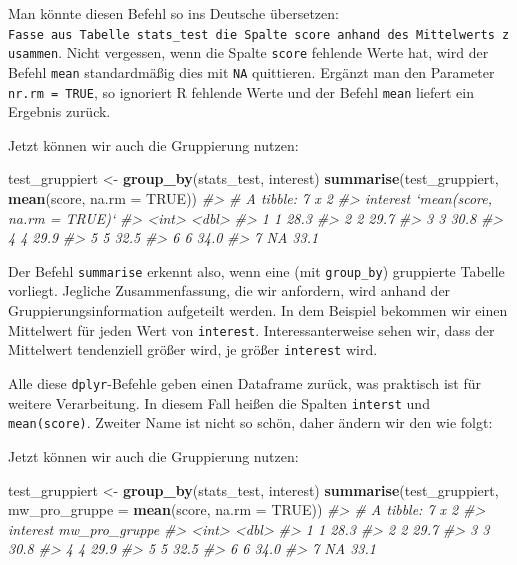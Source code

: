 \documentclass[12pt,ngerman,]{book}
\makeatletter
\newenvironment{Shaded}{\begin{snugshade}}{\end{snugshade}}
\newcommand{\KeywordTok}[1]{\textcolor[rgb]{0.13,0.29,0.53}{\textbf{{#1}}}}
\newcommand{\DataTypeTok}[1]{\textcolor[rgb]{0.13,0.29,0.53}{{#1}}}
\newcommand{\StringTok}[1]{\textcolor[rgb]{0.31,0.60,0.02}{{#1}}}
\newcommand{\CommentTok}[1]{\textcolor[rgb]{0.56,0.35,0.01}{\textit{{#1}}}}
\newcommand{\OtherTok}[1]{\textcolor[rgb]{0.56,0.35,0.01}{{#1}}}
\newcommand{\NormalTok}[1]{{#1}}
\newenvironment{kframe}{%
\medskip{}
\setlength{\fboxsep}{.8em}
 \def\at@end@of@kframe{}%
 \ifinner\ifhmode%
  \def\at@end@of@kframe{\end{minipage}}%
  \begin{minipage}{\columnwidth}%
 \fi\fi%
 \def\FrameCommand##1{\hskip\@totalleftmargin \hskip-\fboxsep
 \colorbox{shadecolor}{##1}\hskip-\fboxsep
     \hskip-\linewidth \hskip-\@totalleftmargin \hskip\columnwidth}%
 \MakeFramed {\advance\hsize-\width
   \@totalleftmargin\z@ \linewidth\hsize
   \@setminipage}}%
 {\par\unskip\endMakeFramed%
 \at@end@of@kframe}
\renewenvironment{Shaded}{\begin{kframe}}{\end{kframe}}
\theoremstyle{definition}
\theoremstyle{definition}
\theoremstyle{remark}
\makeatother
\begin{document}
Man könnte diesen Befehl so ins Deutsche übersetzen:
\texttt{Fasse\ aus\ Tabelle\ stats\_test\ die\ Spalte\ score\ anhand\ des\ Mittelwerts\ zusammen}.
Nicht vergessen, wenn die Spalte \texttt{score} fehlende Werte hat, wird
der Befehl \texttt{mean} standardmäßig dies mit \texttt{NA} quittieren.
Ergänzt man den Parameter \texttt{nr.rm\ =\ TRUE}, so ignoriert R
fehlende Werte und der Befehl \texttt{mean} liefert ein Ergebnis zurück.

Jetzt können wir auch die Gruppierung nutzen:

\begin{Shaded}
\begin{Highlighting}[]
\NormalTok{test_gruppiert <-}\StringTok{ }\KeywordTok{group_by}\NormalTok{(stats_test, interest)}
\KeywordTok{summarise}\NormalTok{(test_gruppiert, }\KeywordTok{mean}\NormalTok{(score, }\DataTypeTok{na.rm =} \OtherTok{TRUE}\NormalTok{))}
\CommentTok{#> # A tibble: 7 x 2}
\CommentTok{#>   interest `mean(score, na.rm = TRUE)`}
\CommentTok{#>      <int>                       <dbl>}
\CommentTok{#> 1        1                        28.3}
\CommentTok{#> 2        2                        29.7}
\CommentTok{#> 3        3                        30.8}
\CommentTok{#> 4        4                        29.9}
\CommentTok{#> 5        5                        32.5}
\CommentTok{#> 6        6                        34.0}
\CommentTok{#> 7       NA                        33.1}
\end{Highlighting}
\end{Shaded}

Der Befehl \texttt{summarise} erkennt also, wenn eine (mit
\texttt{group\_by}) gruppierte Tabelle vorliegt. Jegliche
Zusammenfassung, die wir anfordern, wird anhand der
Gruppierungsinformation aufgeteilt werden. In dem Beispiel bekommen wir
einen Mittelwert für jeden Wert von \texttt{interest}.
Interessanterweise sehen wir, dass der Mittelwert tendenziell größer
wird, je größer \texttt{interest} wird.

Alle diese \texttt{dplyr}-Befehle geben einen Dataframe zurück, was
praktisch ist für weitere Verarbeitung. In diesem Fall heißen die
Spalten \texttt{interst} und \texttt{mean(score)}. Zweiter Name ist
nicht so schön, daher ändern wir den wie folgt:

Jetzt können wir auch die Gruppierung nutzen:

\begin{Shaded}
\begin{Highlighting}[]
\NormalTok{test_gruppiert <-}\StringTok{ }\KeywordTok{group_by}\NormalTok{(stats_test, interest)}
\KeywordTok{summarise}\NormalTok{(test_gruppiert, }\DataTypeTok{mw_pro_gruppe =} \KeywordTok{mean}\NormalTok{(score, }\DataTypeTok{na.rm =} \OtherTok{TRUE}\NormalTok{))}
\CommentTok{#> # A tibble: 7 x 2}
\CommentTok{#>   interest mw_pro_gruppe}
\CommentTok{#>      <int>         <dbl>}
\CommentTok{#> 1        1          28.3}
\CommentTok{#> 2        2          29.7}
\CommentTok{#> 3        3          30.8}
\CommentTok{#> 4        4          29.9}
\CommentTok{#> 5        5          32.5}
\CommentTok{#> 6        6          34.0}
\CommentTok{#> 7       NA          33.1}
\end{Highlighting}
\end{Shaded}
\end{document}
